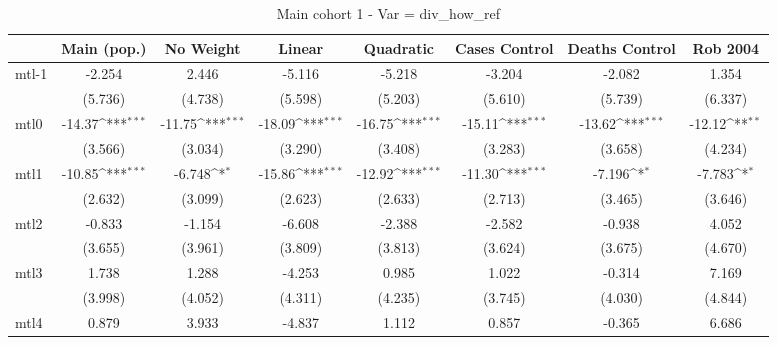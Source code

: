 \documentclass{article}
\begin{document}
{
\def\sym#1{\ifmmode^{#1}\else\(^{#1}\)\fi}
\begin{longtable}{l*{7}{c}}
\caption{Main cohort 1 - Var = div\_how\_ref}\\
\hline\hline\endfirsthead\hline\endhead\hline\endfoot\endlastfoot
                &\multicolumn{1}{c}{Main (pop.)}&\multicolumn{1}{c}{No Weight}&\multicolumn{1}{c}{Linear}&\multicolumn{1}{c}{Quadratic}&\multicolumn{1}{c}{Cases Control}&\multicolumn{1}{c}{Deaths Control}&\multicolumn{1}{c}{Rob 2004}\\
\hline
mtl-1           &   -2.254         &    2.446         &   -5.116         &   -5.218         &   -3.204         &   -2.082         &    1.354         \\
                &  (5.736)         &  (4.738)         &  (5.598)         &  (5.203)         &  (5.610)         &  (5.739)         &  (6.337)         \\
mtl0            &   -14.37\sym{***}&   -11.75\sym{***}&   -18.09\sym{***}&   -16.75\sym{***}&   -15.11\sym{***}&   -13.62\sym{***}&   -12.12\sym{**} \\
                &  (3.566)         &  (3.034)         &  (3.290)         &  (3.408)         &  (3.283)         &  (3.658)         &  (4.234)         \\
mtl1            &   -10.85\sym{***}&   -6.748\sym{*}  &   -15.86\sym{***}&   -12.92\sym{***}&   -11.30\sym{***}&   -7.196\sym{*}  &   -7.783\sym{*}  \\
                &  (2.632)         &  (3.099)         &  (2.623)         &  (2.633)         &  (2.713)         &  (3.465)         &  (3.646)         \\
mtl2            &   -0.833         &   -1.154         &   -6.608         &   -2.388         &   -2.582         &   -0.938         &    4.052         \\
                &  (3.655)         &  (3.961)         &  (3.809)         &  (3.813)         &  (3.624)         &  (3.675)         &  (4.670)         \\
mtl3            &    1.738         &    1.288         &   -4.253         &    0.985         &    1.022         &   -0.314         &    7.169         \\
                &  (3.998)         &  (4.052)         &  (4.311)         &  (4.235)         &  (3.745)         &  (4.030)         &  (4.844)         \\
mtl4            &    0.879         &    3.933         &   -4.837         &    1.112         &    0.857         &   -0.365         &    6.686         \\

\end{longtable}}
\end{document}
